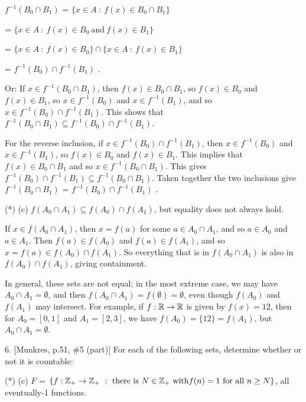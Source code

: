\ssk

$f^{-1}(B_0\cap B_1)$ = $\{x\in A\ :\ f(x)\in B_0\cap B_1\}$

\hskip1in = $\{x\in A\ :\ f(x)\in B_0\ \text{and}\ f(x)\in B_1\}$

\hskip1in = $\{x\in A\ :\ f(x)\in B_0\}\cap\{x\in A\ :\ f(x)\in B_1\}$

\hskip1in = $f^{-1}(B_0) \cap f^{-1}(B_1)$ .

\ssk

Or: If $x\in f^{-1}(B_0\cap B_1)$, then $f(x)\in B_0\cap B_1$, so 
$f(x)\in B_0$ and $f(x)\in B_1$, so $x\in f^{-1}(B_0)$ and $x\in f^{-1}(B_1)$,
and so $x\in f^{-1}(B_0) \cap f^{-1}(B_1)$. This shows that 
$f^{-1}(B_0\cap B_1) \subseteq f^{-1}(B_0) \cap f^{-1}(B_1)$.

For the reverse inclusion, if $x\in f^{-1}(B_0) \cap f^{-1}(B_1)$, then 
$x\in f^{-1}(B_0)$ and $x\in f^{-1}(B_1)$, so $f(x)\in B_0$ and $f(x)\in B_1$.
This implies that $f(x)\in B_0\cap B_1$ and so $x\in f^{-1}(B_0\cap B_1)$. 
This gives $f^{-1}(B_0) \cap f^{-1}(B_1)\subseteq f^{-1}(B_0\cap B_1)$. 
Taken together the two inclusions give 
$f^{-1}(B_0\cap B_1)$ = $f^{-1}(B_0) \cap f^{-1}(B_1)$ .

\ssk

\item{(*)} (c) $f(A_0\cap A_1) \subseteq f(A_0)\cap f(A_1)$, but equality does not always hold.

\ssk

If $x\in f(A_0\cap A_1)$, then $x=f(a)$ for some $a\in A_0\cap A_1$, and so $a\in A_0$ and
$a\in A_1$. Then $f(a)\in f(A_0)$ and $f(a)\in f(A_1)$, and so 
$x=f(a)\in f(A_0)\cap f(A_1)$. So everything that is in $f(A_0\cap A_1)$ is also in $f(A_0)\cap f(A_1)$,
giving containment.

\ssk

In general, these sets are not equal; in the most extreme case, we may have 
$A_0\cap A_1=\emptyset$, and then $f(A_0\cap A_1)=f(\emptyset)=\emptyset$, 
even though $f(A_0)$ and $f(A_1)$ may intersect. For example, if $f:{\Bbb R}\rightarrow {\Bbb R}$
is given by $f(x)=12$, then for $A_0=[0,1]$ and $A_1=[2,3]$, we have
$f(A_0)=\{12\}=f(A_1)$, but $A_0\cap A_1=\emptyset$.

\ssk

\item{6.} [Munkres, p.51, \#5 (part)] For each of the following sets, determine
whether or not it is countable:

\ssk

\item{(*)} (c) $F$ = $\{f:{\Bbb Z}_+\ra {\Bbb Z}_+\ :\ \text{there}\ \text{is}\ N\in{\Bbb Z}_+\ \text{with}
f(n)=1\ \text{for}\ \text{all}\ n\geq N\}$, all eventually-1 functions.


